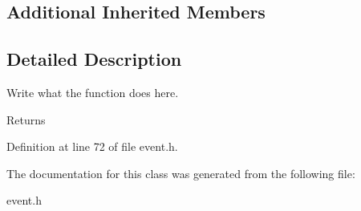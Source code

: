 \subsection*{Additional Inherited Members}


\subsection{Detailed Description}
Write what the function does here. 

\begin{DoxyReturn}{Returns}

\end{DoxyReturn}


Definition at line 72 of file event.\+h.



The documentation for this class was generated from the following file\+:\begin{DoxyCompactItemize}
\item 
event.\+h\end{DoxyCompactItemize}
